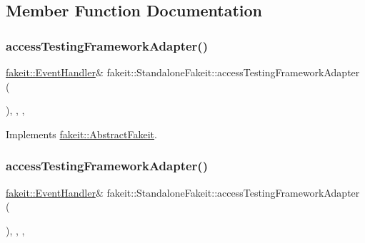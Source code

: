 \subsection{Member Function Documentation}
\mbox{\label{classfakeit_1_1StandaloneFakeit_ad6679af7148f1be2f8276bd6adf5bea2}} 
\subsubsection{\texorpdfstring{accessTestingFrameworkAdapter()}{accessTestingFrameworkAdapter()}\hspace{0.1cm}{\footnotesize\ttfamily [1/2]}}
{\footnotesize\ttfamily \mbox{\hyperlink{structfakeit_1_1EventHandler}{fakeit\+::\+Event\+Handler}}\& fakeit\+::\+Standalone\+Fakeit\+::access\+Testing\+Framework\+Adapter (\begin{DoxyParamCaption}{ }\end{DoxyParamCaption})\hspace{0.3cm}{\ttfamily [inline]}, {\ttfamily [override]}, {\ttfamily [protected]}, {\ttfamily [virtual]}}



Implements \mbox{\hyperlink{classfakeit_1_1AbstractFakeit_a9476180a503524d49d1978fbbc125b01}{fakeit\+::\+Abstract\+Fakeit}}.

\mbox{\label{classfakeit_1_1StandaloneFakeit_ad6679af7148f1be2f8276bd6adf5bea2}} 
\subsubsection{\texorpdfstring{accessTestingFrameworkAdapter()}{accessTestingFrameworkAdapter()}\hspace{0.1cm}{\footnotesize\ttfamily [2/2]}}
{\footnotesize\ttfamily \mbox{\hyperlink{structfakeit_1_1EventHandler}{fakeit\+::\+Event\+Handler}}\& fakeit\+::\+Standalone\+Fakeit\+::access\+Testing\+Framework\+Adapter (\begin{DoxyParamCaption}{ }\end{DoxyParamCaption})\hspace{0.3cm}{\ttfamily [inline]}, {\ttfamily [override]}, {\ttfamily [protected]}, {\ttfamily [virtual]}}



